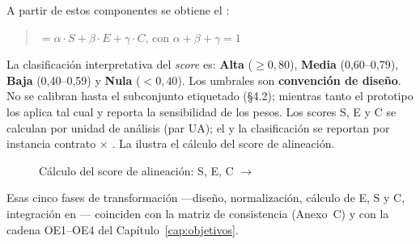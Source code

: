 A partir de estos componentes se obtiene el \AlignmentScore{}:

\begin{quote}
  \AlignmentScore{} $= \alpha \cdot S + \beta \cdot E + \gamma \cdot C$, con $\alpha + \beta +
  \gamma = 1$
\end{quote}

La clasificación interpretativa del \textit{score} es: \textbf{Alta} ($\geq 0{,}80$),
\textbf{Media} (0,60--0,79), \textbf{Baja} (0,40--0,59) y \textbf{Nula} ($< 0{,}40$). Los umbrales
son \textbf{convención de diseño}. No se calibran hasta el subconjunto etiquetado (§4.2);
mientras tanto el prototipo los aplica tal cual y reporta la sensibilidad de los pesos. Los scores S, E y C se calculan por unidad de análisis (par UA); el
\AlignmentScore{} y la clasificación se reportan por instancia contrato $\times$ \ServiceDomain{}.
La  ilustra el cálculo del score de alineación.

\begin{figure}[H]
  \centering
  \figCapThree
  \caption{Cálculo del score de alineación: S, E, C $\rightarrow$ \AlignmentScore{}}
  \label{fig:alignment-score}
\end{figure}

Esas cinco fases de transformación ---diseño, normalización, cálculo de E, S y C, integración en
\AlignmentScore{}--- coinciden con la matriz de consistencia (Anexo~C) y con la cadena OE1--OE4 del
Capítulo~\ref{cap:objetivos}.
